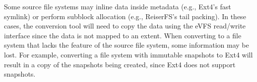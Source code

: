 Some source file systems may inline data inside metadata (e.g., Ext4's fast symlink) or perform subblock allocation (e.g., ReiserFS's tail packing). In these cases, the conversion tool will need to copy the data using the eVFS read/write interface since the data is not mapped to an extent. When converting to a file system that lacks the feature of the source file system, some information may be lost. For example, converting a file system with immutable snapshots to Ext4 will result in a copy of the snapshots being created, since Ext4 does not support snapshots. 





